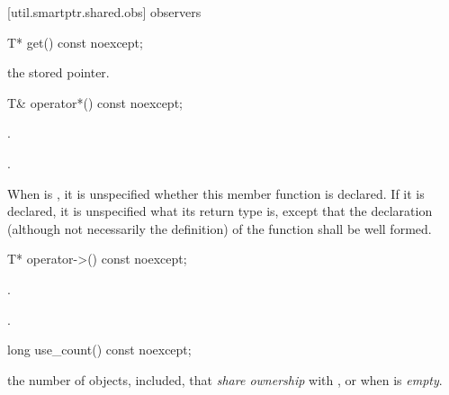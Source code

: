 [util.smartptr.shared.obs]{ observers}
%
%
\begin{itemdecl}
T* get() const noexcept;
\end{itemdecl}

\begin{itemdescr}
\pnum\returns  the stored pointer.
\end{itemdescr}

%
%
\begin{itemdecl}
T& operator*() const noexcept;
\end{itemdecl}

\begin{itemdescr}
\pnum\requires  {}.

\pnum\returns  {}.

\pnum\notes When  is , it is unspecified whether this
member function is declared. If it is declared, it is unspecified what its
return type is, except that the declaration (although not necessarily the
definition) of the function shall be well formed.
\end{itemdescr}

%
%
\begin{itemdecl}
T* operator->() const noexcept;
\end{itemdecl}

\begin{itemdescr}
\pnum\requires  {}.

\pnum\returns  {}.
\end{itemdescr}

%
%
\begin{itemdecl}
long use_count() const noexcept;
\end{itemdecl}

\begin{itemdescr}
\pnum\returns  the number of  objects,  included,
that \textit{share ownership} with , or  when  is
\textit{empty}.
\end{itemdescr}

